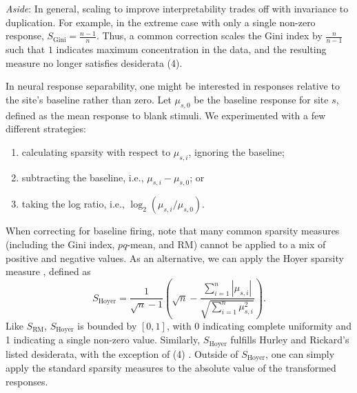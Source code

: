 \documentclass[draft]{cmustatproposal} %
\begin{document}
\textit{Aside}: In general, scaling to improve interpretability trades off with invariance to duplication. For example, in the extreme case with only a single non-zero response, \( S_{\textrm{Gini}} = \frac{n - 1}{n} \). Thus, a common correction scales the Gini index by \( \frac{n}{n - 1} \) such that \( 1 \) indicates maximum concentration in the data, and the resulting measure no longer satisfies desiderata (4).

In neural response separability, one might be interested in responses relative to the site's baseline rather than zero. Let \( \mu_{s, 0} \) be the baseline response for site \( s \), defined as the mean response to blank stimuli.
We experimented with a few different strategies: 

\begin{enumerate}
    \item calculating sparsity with respect to \( \mu_{s, i} \), ignoring the baseline; 
    \item subtracting the baseline, i.e., \( \mu_{s, i} - \mu_{s, 0} \); or
    \item taking the log ratio, i.e., \( \log_2 \left( \mu_{s, i} / \mu_{s, 0} \right). \)
\end{enumerate}

When correcting for baseline firing, note that many common sparsity measures (including the Gini index, \( pq \)-mean, and RM) cannot be applied to a mix of positive and negative values. As an alternative, we can apply the Hoyer sparsity measure \cite{hoyer_non-negative_2004}, defined as
\[ 
S_{\textrm{Hoyer}} = \frac{1}{\sqrt{n} - 1} \left( \sqrt{n} - \frac{\sum_{i = 1}^n |\mu_{s, i}|}{\sqrt{\sum_{i = 1}^n \mu_{s, i}^2}} \right).
\]
Like \( S_{\textrm{RM}}\), \( S_{\textrm{Hoyer}} \) is bounded by \( [0, 1] \), with 0 indicating complete uniformity and 1 indicating a single non-zero value. Similarly, \( S_{\textrm{Hoyer}} \) fulfills Hurley and Rickard's listed desiderata, with the exception of (4) \cite{hurley_comparing_2009}. Outside of \( S_{\textrm{Hoyer}} \), one can simply apply the standard sparsity measures to the absolute value of the transformed responses. 
\end{document}

